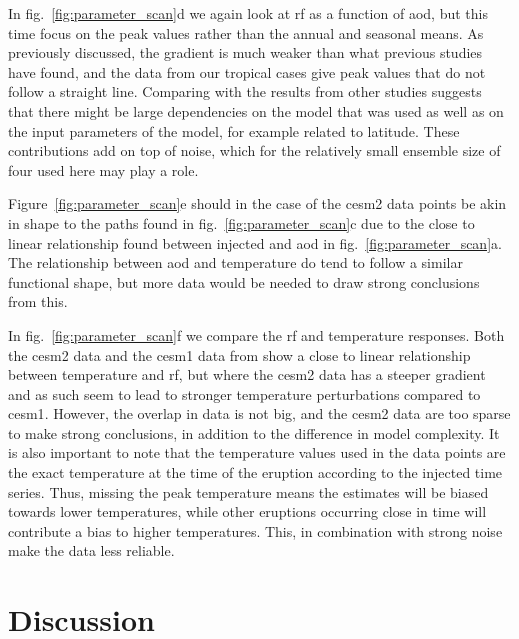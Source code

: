 \documentclass{ametsocV6.1}
\newcommand{\iso}[1][i]{{#1}njected \ce{SO2}}
\begin{document}
In fig.~\ref{fig:parameter_scan}d we again look at \gls{rf} as a function of \gls{aod},
but this time focus on the peak values rather than the annual and seasonal means. As
previously discussed, the gradient is much weaker than what previous studies have found,
and the data from our tropical cases give peak values that do not follow a straight
line. Comparing with the results from other studies \citep{jones2005, ottobliesner2016,
  timmreck2010} suggests that there might be large dependencies on the model that was used
as well as on the input parameters of the model, for example related to latitude. These
contributions add on top of noise, which for the relatively small ensemble size of four
used here may play a role.

Figure~\ref{fig:parameter_scan}e should in the case of the \gls{cesm2} data points be
akin in shape to the paths found in fig.~\ref{fig:parameter_scan}c due to the close to
linear relationship found between \iso{} and \gls{aod} in
fig.~\ref{fig:parameter_scan}a. The relationship between \gls{aod} and temperature do
tend to follow a similar functional shape, but more data would be needed to draw strong
conclusions from this.

In fig.~\ref{fig:parameter_scan}f we compare the \gls{rf} and temperature responses.
Both the \gls{cesm2} data and the \gls{cesm1} data from \citet{ottobliesner2016} show a
close to linear relationship between temperature and \gls{rf}, but where the \gls{cesm2}
data has a steeper gradient and as such seem to lead to stronger temperature
perturbations compared to \gls{cesm1}. However, the overlap in data is not big, and the
\gls{cesm2} data are too sparse to make strong conclusions, in addition to the
difference in model complexity. It is also important to note that the temperature values
used in the \citet{ottobliesner2016} data points are the exact temperature at the time
of the eruption according to the \iso{} time series. Thus, missing the peak temperature
means the estimates will be biased towards lower temperatures, while other eruptions
occurring close in time will contribute a bias to higher temperatures. This, in
combination with strong noise make the data less reliable.

\section{Discussion}

\end{document}
